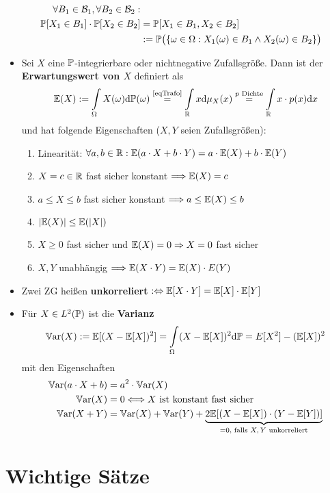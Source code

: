 \begin{itemize}
\begin{align*}
		\forall B_1\in\B_1,\forall B_2\in\B_2:\\
		\P[X_1\in B_1]\cdot \P[X_2\in B_2]
		&=
		\P[X_1\in B_1, X_2\in B_2]\\
		&:=\P\big(\lbrace\omega\in\Omega:X_1(\omega)\in B_1\wedge X_2(\omega)\in B_2\rbrace\big)
	\end{align*}
	\item Sei $X$ eine $\P$-integrierbare oder nichtnegative Zufallsgröße. Dann ist der \textbf{Erwartungswert von $X$} definiert als
	\begin{align*}
		\E(X):=\int\limits_\Omega X(\omega)\d\P(\omega)
		\stackeq{\text{\ref{eqTrafo}}}
		\int\limits_\R x\d\mu_X (x)
		\stackeq{p\text{ Dichte}}
		\int\limits_\R x\cdot p(x)\d x
	\end{align*}
	und hat folgende Eigenschaften ($X,Y$ seien Zufallsgrößen):
	\begin{enumerate}
		\item Linearität: $\forall a,b\in\R:\E(a\cdot X+b\cdot Y)=a\cdot \E(X)+b\cdot\E(Y)$
		\item $X=c\in\R$ fast sicher konstant $\Longrightarrow\E(X)=c$
		\item $a\leq X\leq b$ fast sicher konstant $\Longrightarrow a\leq\E(X)\leq b$
		\item $|\E(X)|\leq\E(|X|)$
		\item $X\geq0$ fast sicher und $\E(X)=0\Rightarrow X=0$ fast sicher
		\item $X,Y$ unabhängig $\Longrightarrow\E(X\cdot Y)=\E(X)\cdot E(Y)$
	\end{enumerate}
	\item Zwei ZG heißen \textbf{unkorreliert} $:\gdw\E[X\cdot Y]=\E[X]\cdot\E[Y]$
	\item Für $X\in L^2(\P)$ ist die \textbf{Varianz} 
	\begin{align*}
		\Var(X):=\E[(X-\E[X])^2]=\int\limits_\Omega(X-\E[X])^2\d\P=E[X^2]-(\E[X])^2
	\end{align*}
	mit den Eigenschaften
	\begin{align*}
		\Var(a\cdot X+b)&=a^2\cdot\Var(X)\\
		\Var(X)&=0\Longleftrightarrow X\text{ ist konstant fast sicher}\\
		\Var(X+Y)&=\Var(X)+\Var(Y)+\underbrace{2\E[(X-\E[X])\cdot(Y-\E[Y])]}_{=0\text{, falls $X,Y$ unkorreliert}}
	\end{align*}
\end{itemize}

\section{Wichtige Sätze}

